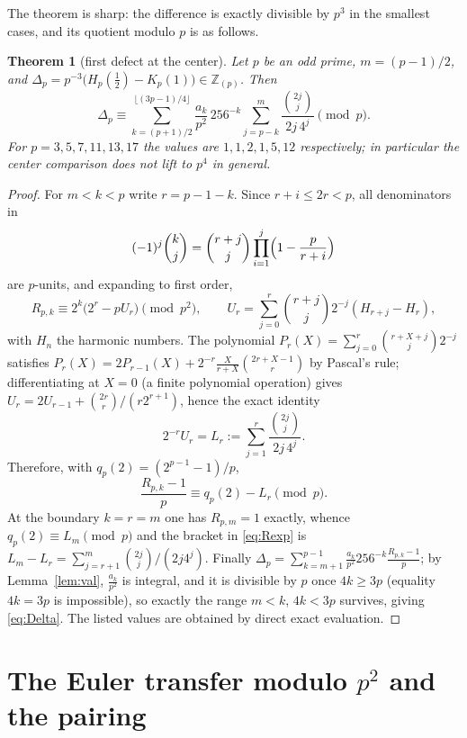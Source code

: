 \documentclass[11pt]{amsart}
\newtheorem{theorem}{Theorem}[section]
\theoremstyle{definition}
\theoremstyle{remark}
\newcommand{\Zp}{\mathbb{Z}_{(p)}}
\begin{document}
The theorem is sharp: the difference is exactly divisible by $p^3$ in
the smallest cases, and its quotient modulo $p$ is as follows.

\begin{theorem}[first defect at the center]\label{thm:Bp}
Let $p$ be an odd prime, $m=(p-1)/2$, and
$\Delta_p=p^{-3}\bigl(H_p(\frac12)-K_p(1)\bigr)\in\Zp$. Then
\begin{equation}\label{eq:Delta}
\Delta_p\equiv
\sum_{k=(p+1)/2}^{\lfloor(3p-1)/4\rfloor}
\frac{a_k}{p^2}\,256^{-k}
\sum_{j=p-k}^{m}\frac{\binom{2j}{j}}{2j\,4^j}
\pmod p .
\end{equation}
For $p=3,5,7,11,13,17$ the values are $1,1,2,1,5,12$ respectively; in
particular the center comparison does not lift to $p^4$ in general.
\end{theorem}

\begin{proof}
For $m<k<p$ write $r=p-1-k$. Since $r+i\le2r<p$, all denominators in
\[
(-1)^j\binom{k}{j}
=\binom{r+j}{j}\prod_{i=1}^{j}\Bigl(1-\frac{p}{r+i}\Bigr)
\]
are $p$-units, and expanding to first order,
\[
R_{p,k}\equiv2^k\bigl(2^r-pU_r\bigr)\pmod{p^2},
\qquad
U_r=\sum_{j=0}^{r}\binom{r+j}{j}2^{-j}(H_{r+j}-H_r),
\]
with $H_n$ the harmonic numbers. The polynomial
$P_r(X)=\sum_{j=0}^r\binom{r+X+j}{j}2^{-j}$ satisfies
$P_r(X)=2P_{r-1}(X)+2^{-r}\frac{X}{r+X}\binom{2r+X-1}{r}$
by Pascal's rule; differentiating at $X=0$ (a finite polynomial
operation) gives
$U_r=2U_{r-1}+\binom{2r}{r}/(r2^{r+1})$, hence the exact identity
\[
2^{-r}U_r=L_r:=\sum_{j=1}^{r}\frac{\binom{2j}{j}}{2j\,4^j}.
\]
Therefore, with $q_p(2)=(2^{p-1}-1)/p$,
\begin{equation}\label{eq:Rexp}
\frac{R_{p,k}-1}{p}\equiv q_p(2)-L_r\pmod p .
\end{equation}
At the boundary $k=r=m$ one has $R_{p,m}=1$ exactly, whence
$q_p(2)\equiv L_m\pmod p$ and the bracket in \eqref{eq:Rexp} is
$L_m-L_r=\sum_{j=r+1}^{m}\binom{2j}{j}/(2j4^j)$. Finally
$\Delta_p=\sum_{k=m+1}^{p-1}\frac{a_k}{p^2}256^{-k}\frac{R_{p,k}-1}{p}$;
by Lemma~\ref{lem:val}, $\frac{a_k}{p^2}$ is integral, and it is
divisible by $p$ once $4k\ge3p$ (equality $4k=3p$ is impossible), so
exactly the range $m<k$, $4k<3p$ survives, giving \eqref{eq:Delta}.
The listed values are obtained by direct exact evaluation.
\end{proof}

\section{The Euler transfer modulo \texorpdfstring{$p^2$}{p-squared} and the pairing}\label{sec:4}
\end{document}
